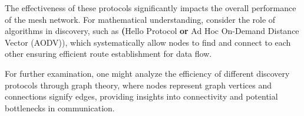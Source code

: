 The effectiveness of these protocols significantly impacts the overall performance of the mesh network. For mathematical understanding, consider the role of algorithms in discovery, such as \textbf(Hello Protocol\textbf{ or }Ad Hoc On-Demand Distance Vector (AODV)), which systematically allow nodes to find and connect to each other ensuring efficient route establishment for data flow.

For further examination, one might analyze the efficiency of different discovery protocols through graph theory, where nodes represent graph vertices and connections signify edges, providing insights into connectivity and potential bottlenecks in communication.

